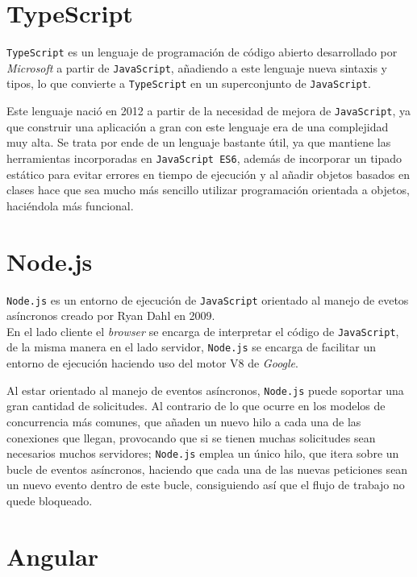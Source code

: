 \documentclass[a4paper, 12pt]{book}
\begin{document}
\section{TypeScript}
\label{sec:typescript}

\texttt{TypeScript}\cite{typescript} es un lenguaje de programación de código abierto desarrollado por \textit{Microsoft} a partir de \texttt{JavaScript}, añadiendo a este lenguaje nueva sintaxis y tipos, lo que convierte a \texttt{TypeScript} en un superconjunto de \texttt{JavaScript}.

Este lenguaje nació en 2012 a partir de la necesidad de mejora de \texttt{JavaScript}, ya que construir una aplicación a gran con este lenguaje era de una complejidad muy alta. Se trata por ende de un lenguaje bastante útil, ya que mantiene las herramientas incorporadas en \texttt{JavaScript ES6}, además de incorporar un tipado estático para evitar errores en tiempo de ejecución y al añadir objetos basados en clases hace que sea mucho más sencillo utilizar programación orientada a objetos, haciéndola más funcional.

\section{Node.js}
\label{sec:nodejs}

\texttt{Node.js}\cite{nodejs} es un entorno de ejecución de \texttt{JavaScript} orientado al manejo de evetos asíncronos creado por Ryan Dahl en 2009.\\
En el lado cliente el \textit{browser} se encarga de interpretar el código de \texttt{JavaScript}, de la misma manera en el lado servidor, \texttt{Node.js} se encarga de facilitar un entorno de ejecución haciendo uso del motor V8 de \textit{Google}.

Al estar orientado al manejo de eventos asíncronos, \texttt{Node.js} puede soportar una gran cantidad de solicitudes. Al contrario de lo que ocurre en los modelos de concurrencia más comunes, que añaden un nuevo hilo a cada una de las conexiones que llegan, provocando que si se tienen muchas solicitudes sean necesarios muchos servidores; \texttt{Node.js} emplea un único hilo, que itera sobre un bucle de eventos asíncronos, haciendo que cada una de las nuevas peticiones sean un nuevo evento dentro de este bucle, consiguiendo así que el flujo de trabajo no quede bloqueado.

\section{Angular}
\label{sec:angular}
\end{document}
